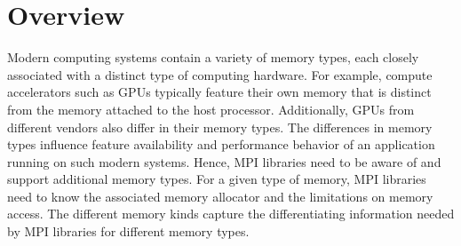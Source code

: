 
\renewcommand{\Color}[1]{}

\newenvironment{etabular}
  {\edtable{tabular}}
  {\endedtable}

\newcommand{\semanticstwo}[2]
{
\Color{green}
\begin{etabular}{l|l}
\hspace*{0.1cm} & #1 \\
& #2\\
\end{etabular}
\vspace*{0.2cm}
\Color{black}
}

\newcommand{\semanticsthree}[3]
{
\Color{green}
\begin{etabular}{l|l}
\hspace*{0.1cm} & #1 \\
& #2\\
& #3\\
\end{etabular}
\vspace*{0.2cm}
\Color{black}
}

\newcommand{\semanticsfour}[4]
{
\Color{green}
\begin{etabular}{l|l}
\hspace*{0.1cm} & #1 \\
& #2\\
& #3\\
& #4\\
\end{etabular}
\vspace*{0.2cm}
\Color{black}
}

\chapter{Overview}

Modern computing systems contain a variety of memory types, each
closely associated with a distinct type of computing hardware. For
example, compute accelerators such as GPUs typically feature their
own memory that is distinct from the memory attached to the host
processor. Additionally, GPUs from different vendors also differ
in their memory types. The differences in memory types influence
feature availability and performance behavior of an application
running on such modern systems. Hence, MPI libraries need to be
aware of and support additional memory types. For a given type of
memory, MPI libraries need to know the associated memory allocator and
the limitations on memory access. The different memory kinds capture
the differentiating information needed by MPI libraries for different
memory types. 


